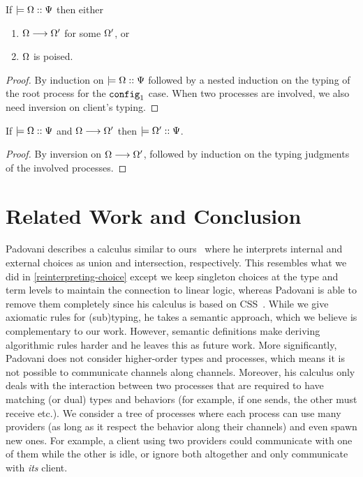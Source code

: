 \documentclass[submission,copyright,creativecommons]{eptcs}
\begin{document}
\begin{theorem}[Progress]
If $\models {\Omega} :: {\Psi}$ then either
\begin{enumerate}
  \item $\Omega \longrightarrow \Omega'$ for some $\Omega'$, or
  \item $\Omega$ is poised.
\end{enumerate}
\end{theorem}
\begin{proof}
  By induction on $\models {\Omega} :: {\Psi}$ followed by a nested induction on the typing of the root process for the $\texttt{config}_1$ case. When two processes are involved, we also need inversion on client's typing.
\end{proof}

\begin{theorem}[Preservation]
If $\models {\Omega} :: {\Psi}$ and $\Omega \longrightarrow \Omega'$ then $\models {\Omega'} :: {\Psi}$.
\end{theorem}
\begin{proof}
  By inversion on $\Omega \longrightarrow \Omega'$, followed by induction on the typing judgments of the involved processes.
\end{proof}


\section{Related Work and Conclusion}
\label{conclusion}

Padovani describes a calculus similar to ours~\cite{Padovani10} where he interprets internal and external choices as union and intersection, respectively. This resembles what we did in \cref{reinterpreting-choice} except we keep singleton choices at the type and term levels to maintain the connection to linear logic, whereas Padovani is able to remove them completely since his calculus is based on \textsc{CSS}~\cite{NicolaH87}. While we give axiomatic rules for (sub)typing, he takes a semantic approach, which we believe is complementary to our work. However, semantic definitions make deriving algorithmic rules harder and he leaves this as future work. More significantly, Padovani does not consider higher-order types and processes, which means it is not possible to communicate channels along channels. Moreover, his calculus only deals with the interaction between two processes that are required to have matching (or dual) types and behaviors (for example, if one sends, the other must receive etc.). We consider a tree of processes where each process can use many providers (as long as it respect the behavior along their channels) and even spawn new ones. For example, a client using two providers could communicate with one of them while the other is idle, or ignore both altogether and only communicate with \emph{its} client.
\end{document}
